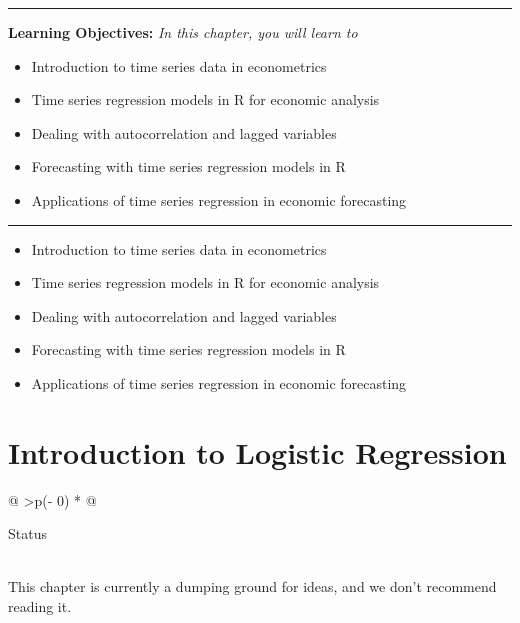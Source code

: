 \documentclass[
  letterpaper,
  paper =a4,
  twoside,
  openright,
  headsepline,
  footsepline,
  listof = totocnumbered,
  chapterprefix = true,
  firstiscover]{scrbook}
\providecommand{\abstractname}{Learning Objectives} %
\newenvironment{objectives}[1]{%
	\hrule
	\vspace{5pt}
	\small\textbf{\abstractname: } 
	\newline
	\vspace{0.1cm}
	\small\emph{#1} %
	\itshape %
}{%
	\vspace{5pt}
	\hrule
	\vspace{0.6cm}
}
\begin{document}
\begin{objectives}{In this chapter, you will learn to}
\begin{itemize}

\item{Introduction to time series data in econometrics}

\item{Time series regression models in R for economic analysis}

\item{Dealing with autocorrelation and lagged variables}

\item{Forecasting with time series regression models in R}

\item{Applications of time series regression in economic forecasting}

\end{itemize}

\end{objectives}

\begin{itemize}
\item
  Introduction to time series data in econometrics
\item
  Time series regression models in R for economic analysis
\item
  Dealing with autocorrelation and lagged variables
\item
  Forecasting with time series regression models in R
\item
  Applications of time series regression in economic forecasting
\end{itemize}


\hypertarget{introduction-to-logistic-regression}{%
\chapter{Introduction to Logistic
Regression}\label{introduction-to-logistic-regression}}

\begin{longtable}[]{@{}
  >{\centering\arraybackslash}p{(\columnwidth - 0\tabcolsep) * }@{}}
\toprule\noalign{}
\begin{minipage}[b]{\linewidth}\centering
Status
\end{minipage} \\
\midrule\noalign{}
\endhead
\bottomrule\noalign{}
\endlastfoot
This chapter is currently a dumping ground for ideas, and we don't
recommend reading it. \\
\end{longtable}
\end{document}
